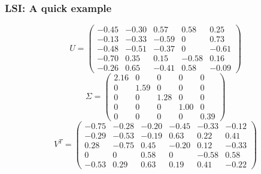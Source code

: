 	\begin{frame}[plain]
	 	\frametitle{LSI: A quick example}
\begin{equation}
 U =
\begin{pmatrix}
 -0.45 & -0.30 & 0.57 & 0.58 & 0.25 \\
 -0.13 & -0.33 & -0.59 & 0 & 0.73 \\
 -0.48 & -0.51 & -0.37 & 0 & -0.61 \\
 -0.70 & 0.35 & 0.15 & -0.58 & 0.16\\
 -0.26 & 0.65 & -0.41 & 0.58 & -0.09 \end{pmatrix}
\end{equation}
\begin{equation}
 \Sigma =
\begin{pmatrix}
 2.16 & 0 & 0 & 0 & 0\\
 0 & 1.59 & 0 & 0 & 0\\
 0 & 0 & 1.28 & 0 & 0\\
 0 & 0 & 0 & 1.00 & 0\\
 0 & 0 & 0 & 0 & 0.39 \end{pmatrix}
\end{equation}
\begin{equation}
  V^{T} = 
\begin{pmatrix}
 -0.75 & -0.28 & -0.20 & -0.45 & -0.33 & -0.12\\
 -0.29 & -0.53 & -0.19 &  0.63 &  0.22 &  0.41\\
  0.28 & -0.75 &  0.45 & -0.20 &  0.12 & -0.33\\
  0    &  0    &  0.58 &  0    & -0.58 &  0.58\\
 -0.53 &  0.29 &  0.63 &  0.19 &  0.41 & -0.22 \end{pmatrix}
\end{equation}
	\end{frame}
